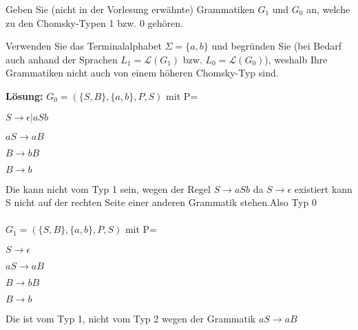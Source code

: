 \documentclass[12pt]{article}
\begin{document}
 Geben Sie (nicht in der Vorlesung erwähnte) Grammatiken $G_1$ und $G_0$ an, welche zu den Chomsky-Typen 1 bzw. 0 gehören.  
  
 Verwenden Sie das Terminalalphabet $\Sigma = \{a,b\}$ und begründen Sie (bei Bedarf auch anhand der Sprachen $L_1 = \mathcal{L}(G_1)$ bzw. $L_0 = \mathcal{L}(G_0)$), weshalb Ihre Grammatiken nicht auch von einem höheren Chomsky-Typ sind.  
  
\textbf{  Lösung:
}  
$G_0=(\{S,B\},\{a,b\},P,S)$ mit P=

$S \rightarrow \epsilon |aSb$

$aS \rightarrow aB$

$B \rightarrow bB$

$B \rightarrow b$ 

Die kann nicht vom Typ 1 sein, wegen der Regel  $S \rightarrow aSb$ da $S \rightarrow \epsilon$ existiert kann S nicht auf der rechten Seite einer anderen Grammatik stehen.Also Typ 0\\\\
$G_1=(\{S,B\},\{a,b\},P,S)$ mit P=

$S \rightarrow \epsilon $

$aS \rightarrow aB$

$B \rightarrow bB$

$B \rightarrow b$ 


Die ist vom Typ 1, nicht vom Typ 2 wegen der Grammatik $aS \rightarrow aB$

 
\end{document}
